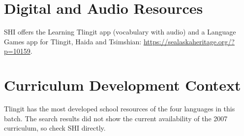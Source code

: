 \documentclass[12pt]{article}
\begin{document}
\section{Digital and Audio Resources}
SHI offers the Learning Tlingit app (vocabulary with audio) and a Language Games app for Tlingit, Haida and Tsimshian: \url{https://sealaskaheritage.org/?p=10159}.

\section{Curriculum Development Context}
Tlingit has the most developed school resources of the four languages in this batch. The search results did not show the current availability of the 2007 curriculum, so check SHI directly.
\end{document}
